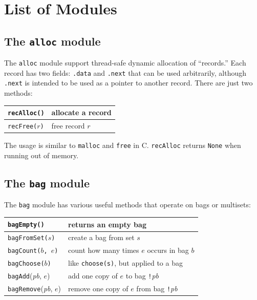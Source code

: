 \documentclass{report}
\begin{document}
\chapter{List of Modules}
\label{ap:module}

\section{The \texttt{alloc} module}

The \texttt{alloc} module
%
support thread-safe dynamic allocation of ``records.''
Each record has two fields: \texttt{.data} and \texttt{.next} that
can be used arbitrarily, although \texttt{.next} is intended to be
used as a pointer to another record.
There are just two methods:

\vspace{1em}
\begin{tabular}{|l|l|}
\hline
\texttt{recAlloc()} & allocate a record \\
\hline
\texttt{recFree($r$)} & free record $r$ \\
\hline
\end{tabular}
\vspace{1em}

The usage is similar to \texttt{malloc} and \texttt{free} in C.
\texttt{recAlloc} returns \texttt{None} when running out of memory.

\section{The \texttt{bag} module}

The \texttt{bag} module
%
has various useful methods that operate on bags or
multisets:

\vspace{1em}
\begin{tabular}{|l|l|}
\hline
\texttt{bagEmpty()} & returns an empty bag\\
\hline
\texttt{bagFromSet($s$)} & create a bag from set $s$\\
\hline
\texttt{bagCount($b$, $e$)} & count how many times $e$ occurs in bag $b$\\
\hline
\texttt{bagChoose($b$)} & like \texttt{choose(s)}, but applied to a bag\\
\hline
\texttt{bagAdd}(\textit{pb}, $e$) & add one copy of $e$ to bag \texttt{!{}}\textit{pb}\\
\hline
\texttt{bagRemove}(\textit{pb}, $e$) & remove one copy of $e$ from bag \texttt{!{}}\textit{pb}\\
\hline
\end{tabular}
\end{document}
